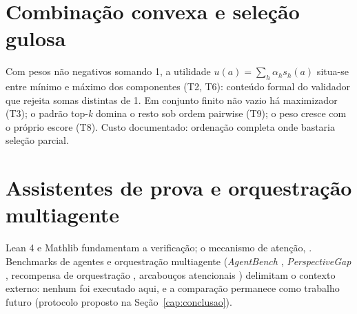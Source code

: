 \section{Combinação convexa e seleção gulosa}
Com pesos não negativos somando 1, a utilidade $u(a)=\sum_h\alpha_h s_h(a)$ situa-se entre mínimo e máximo dos componentes (T2, T6): conteúdo formal do validador que rejeita somas distintas de 1. Em conjunto finito não vazio há maximizador (T3); o padrão top-\textit{k} domina o resto sob ordem pairwise (T9); o peso cresce com o próprio escore (T8). Custo documentado: ordenação completa onde bastaria seleção parcial.
\section{Assistentes de prova e orquestração multiagente}
Lean 4 \cite{moura2021} e Mathlib \cite{mathlib2020} fundamentam a verificação; o mecanismo de atenção, \cite{vaswani2017}. Benchmarks de agentes e orquestração multiagente (\textit{AgentBench} \cite{agentbench2023}, \textit{PerspectiveGap} \cite{perspectivegap2026}, recompensa de orquestração \cite{orchrm2026}, arcabouços atencionais \cite{orchestrator2025}) delimitam o contexto externo: nenhum foi executado aqui, e a comparação permanece como trabalho futuro (protocolo proposto na Seção~\ref{cap:conclusao}).
